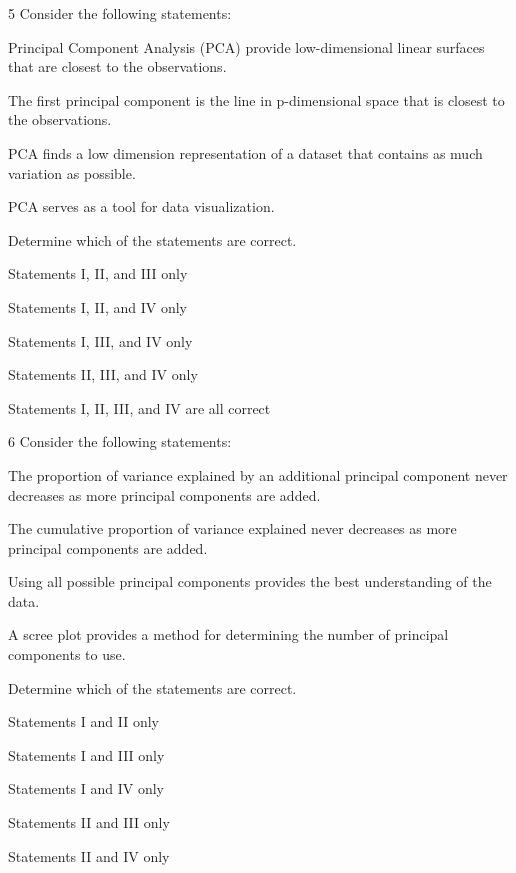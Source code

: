 \begin{question}{5}
Consider the following statements:
\begin{statements}
\item Principal Component Analysis (PCA) provide low-dimensional linear surfaces that are closest to the observations.
\item The first principal component is the line in p-dimensional space that is closest to the observations.
\item PCA finds a low dimension representation of a dataset that contains as much variation as possible.
\item PCA serves as a tool for data visualization.
\end{statements}

Determine which of the statements are correct.

\begin{choices}
\item Statements I, II, and III only
\item Statements I, II, and IV only
\item Statements I, III, and IV only
\item Statements II, III, and IV only
\item Statements I, II, III, and IV are all correct
\end{choices}
\end{question}

\begin{question}{6}
Consider the following statements:
\begin{statements}
\item The proportion of variance explained by an additional principal component never decreases as more principal components are added.
\item The cumulative proportion of variance explained never decreases as more principal components are added.
\item Using all possible principal components provides the best understanding of the data.
\item A scree plot provides a method for determining the number of principal components to use.
\end{statements}

Determine which of the statements are correct.

\begin{choices}
\item Statements I and II only
\item Statements I and III only
\item Statements I and IV only
\item Statements II and III only
\item Statements II and IV only
\end{choices}
\end{question}

